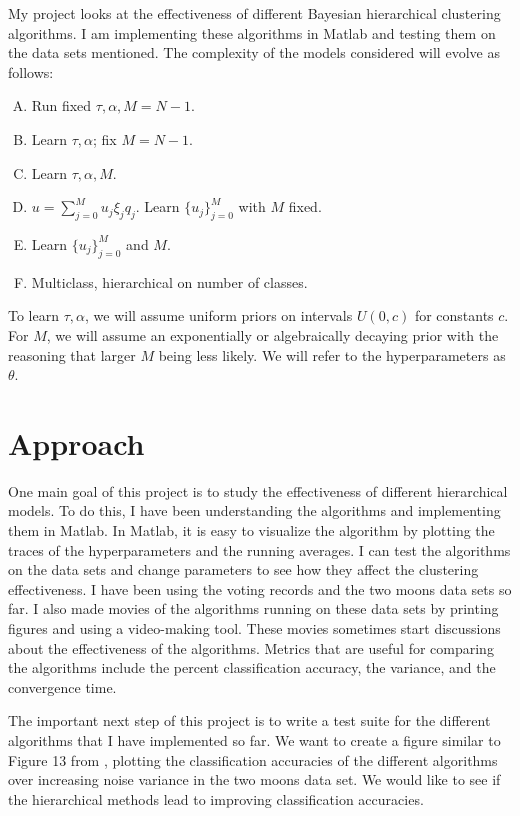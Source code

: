 \documentclass{siamart1116}
\begin{document}
My project looks at the effectiveness of different Bayesian hierarchical clustering algorithms. I am implementing these algorithms in Matlab and testing them on the data sets mentioned. The complexity of the models considered will evolve as follows:

\begin{enumerate}[A)]
\item Run fixed $\tau,\alpha, M=N-1$.
\item Learn $\tau,\alpha$; fix $M=N-1$.
\item Learn $\tau,\alpha,M$.
\item $u = \sum_{j=0}^M u_j\xi_j q_j$. Learn $\{u_j\}_{j=0}^M$ with $M$ fixed.
\item Learn $\{u_j\}_{j=0}^M$ and $M$.
\item Multiclass, hierarchical on number of classes.
\end{enumerate}
To learn $\tau, \alpha$, we will assume uniform priors on intervals $U(0, c)$ for constants $c$. For $M$, we will assume an exponentially or algebraically decaying prior with the reasoning that larger $M$ being less likely. We will refer to the hyperparameters as $\theta$.

\section{Approach}
One main goal of this project is to study the effectiveness of different hierarchical models. To do this, I have been understanding the algorithms and implementing them in Matlab. In Matlab, it is easy to visualize the algorithm by plotting the traces of the hyperparameters and the running averages. I can test the algorithms on the data sets and change parameters to see how they affect the clustering effectiveness. I have been using the voting records and the two moons data sets so far. I also made movies of the algorithms running on these data sets by printing figures and using a video-making tool. These movies sometimes start discussions about the effectiveness of the algorithms. Metrics that are useful for comparing the algorithms include the percent classification accuracy, the variance, and the convergence time.

The important next step of this project is to write a test suite for the different algorithms that I have implemented so far. We want to create a figure similar to Figure 13 from \cite{BeLuStZy17}, plotting the classification accuracies of the different algorithms over increasing noise variance in the two moons data set. We would like to see if the hierarchical methods lead to improving classification accuracies.
\end{document}
